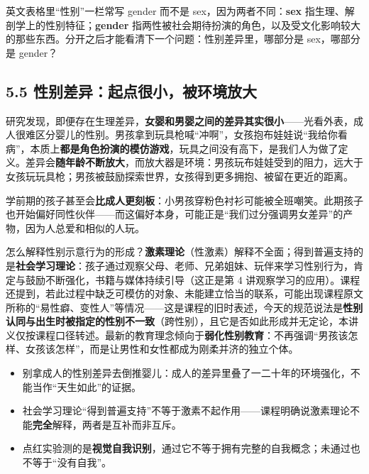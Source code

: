 \documentclass[UTF8,a4paper,11pt]{ctexart}
\begin{document}
英文表格里“性别”一栏常写 gender 而不是 sex，因为两者不同：\textbf{sex} 指生理、解剖学上的性别特征；\textbf{gender} 指两性被社会期待扮演的角色，以及受文化影响较大的那些东西。分开之后才能看清下一个问题：性别差异里，哪部分是 sex，哪部分是 gender？

\subsection*{5.5 性别差异：起点很小，被环境放大}

\begin{keyconcept}[差异主要被环境强化放大]
研究发现，即便存在生理差异，\textbf{女婴和男婴之间的差异其实很小}——光看外表，成人很难区分婴儿的性别。男孩拿到玩具枪喊“冲啊”，女孩抱布娃娃说“我给你看病”，本质上\textbf{都是角色扮演的模仿游戏}，玩具之间没有高下，是我们人为做了定义。差异会\textbf{随年龄不断放大}，而放大器是环境：男孩玩布娃娃受到的阻力，远大于女孩玩玩具枪；男孩被鼓励探索世界，女孩得到更多拥抱、被留在更近的距离。
\end{keyconcept}

学前期的孩子甚至会\textbf{比成人更刻板}：小男孩穿粉色衬衫可能被全班嘲笑。此期孩子也开始偏好同性伙伴——而这偏好本身，可能正是“我们过分强调男女差异”的产物，因为人总爱和相似的人玩。

怎么解释性别示意行为的形成？\textbf{激素理论}（性激素）解释不全面；得到普遍支持的是\textbf{社会学习理论}：孩子通过观察父母、老师、兄弟姐妹、玩伴来学习性别行为，肯定与鼓励不断强化，书籍与媒体持续引导（这正是第 4 讲观察学习的应用）。课程还提到，若此过程中缺乏可模仿的对象、未能建立恰当的联系，可能出现课程原文所称的“易性癖、变性人”等情况——这是课程的旧时表述，今天的规范说法是\textbf{性别认同与出生时被指定的性别不一致}（跨性别），且它是否如此形成并无定论，本讲义仅按课程口径转述。最新的教育理念倾向于\textbf{弱化性别教育}：不再强调“男孩该怎样、女孩该怎样”，而是让男性和女性都成为刚柔并济的独立个体。

\begin{keyconcept}[易错点与失效边界]
\begin{itemize}
  \item 别拿成人的性别差异去倒推婴儿：成人的差异里叠了一二十年的环境强化，不能当作“天生如此”的证据。
  \item 社会学习理论“得到普遍支持”不等于激素不起作用——课程明确说激素理论不能\textbf{完全}解释，两者是互补而非互斥。
  \item 点红实验测的是\textbf{视觉自我识别}，通过它不等于拥有完整的自我概念；未通过也不等于“没有自我”。
\end{itemize}
\end{keyconcept}
\end{document}
